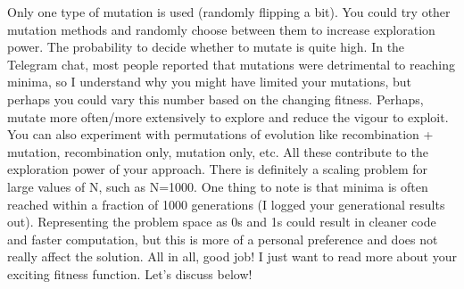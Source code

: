 {}\markdownRendererOlBegin
{}Only one type of mutation is used (randomly flipping a bit). You could try other mutation methods and randomly choose between them to increase exploration power.\markdownRendererOlItemEnd 
{}The probability to decide whether to mutate is quite high. In the Telegram chat, most people reported that mutations were detrimental to reaching minima, so I understand why you might have limited your mutations, but perhaps you could vary this number based on the changing fitness. Perhaps, mutate more often/more extensively to explore and reduce the vigour to exploit. You can also experiment with permutations of evolution like recombination + mutation, recombination only, mutation only, etc. All these contribute to the exploration power of your approach.\markdownRendererOlItemEnd 
{}There is definitely a scaling problem for large values of N, such as \markdownRendererDollarSign{}N=1000\markdownRendererDollarSign{}. One thing to note is that minima is often reached within a fraction of 1000 generations (I logged your generational results out).\markdownRendererOlItemEnd 
{}Representing the problem space as 0s and 1s could result in cleaner code and faster computation, but this is more of a personal preference and does not really affect the solution.\markdownRendererOlItemEnd 
\markdownRendererOlEnd \markdownRendererInterblockSeparator
{}All in all, good job! I just want to read more about your exciting fitness function. Let's discuss below!\relax